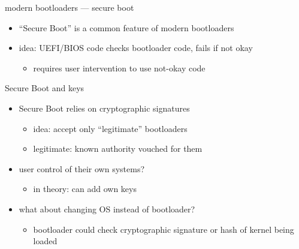 
\begin{frame}{modern bootloaders --- secure boot}
    \begin{itemize}
    \item ``Secure Boot'' is a common feature of modern bootloaders
    \item idea: UEFI/BIOS code checks bootloader code, fails if not okay
        \begin{itemize}
        \item requires user intervention to use not-okay code
        \end{itemize}
    \end{itemize}
\end{frame}

\begin{frame}{Secure Boot and keys}
    \begin{itemize}
    \item Secure Boot relies on cryptographic signatures
        \begin{itemize}
        \item idea: accept only ``legitimate'' bootloaders
        \item legitimate: known authority vouched for them
        \end{itemize}
    \item user control of their own systems?
        \begin{itemize}
        \item in theory: can add own keys
        \end{itemize}
    \item what about changing OS instead of bootloader?
        \begin{itemize}
        \item bootloader could check cryptographic signature or hash of kernel being loaded
        \end{itemize}
    \end{itemize}
\end{frame}


